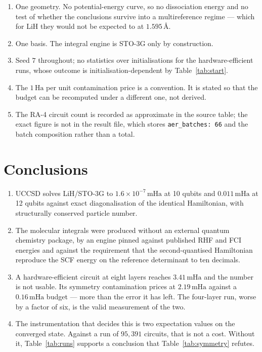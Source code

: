\documentclass[11pt,a4paper]{article}
\newcommand{\mHa}{\ensuremath{\,\mathrm{mHa}}}
\newcommand{\Ha}{\ensuremath{\,\mathrm{Ha}}}
\newcommand{\Ang}{\ensuremath{\,\text{\AA}}}
\newcommand{\code}[1]{\texttt{\small #1}}
\begin{document}
\begin{enumerate}[leftmargin=1.4em,itemsep=0.2em]
\item One geometry. No potential-energy curve, so no dissociation energy and no
  test of whether the conclusions survive into a multireference regime --- which
  for LiH they would not be expected to at $1.595\Ang$.
\item One basis. The integral engine is STO-3G only by construction.
\item Seed $7$ throughout; no statistics over initialisations for the
  hardware-efficient runs, whose outcome is initialisation-dependent by
  Table~\ref{tab:start}.
\item The $1\Ha$ per unit contamination price is a convention. It is stated so
  that the budget can be recomputed under a different one, not derived.
\item The RA-4 circuit count is recorded as approximate in the source table;
  the exact figure is not in the result file, which stores
  \code{aer\_batches: 66} and the batch composition rather than a total.
\end{enumerate}

\section{Conclusions}

\begin{enumerate}[leftmargin=1.4em,itemsep=0.25em]

\item UCCSD solves LiH/STO-3G to $1.6\times10^{-7}\mHa$ at 10 qubits and
  $0.011\mHa$ at 12 qubits against exact diagonalisation of the identical
  Hamiltonian, with structurally conserved particle number.

\item The molecular integrals were produced without an external quantum
  chemistry package, by an engine pinned against published RHF and FCI energies
  and against the requirement that the second-quantised Hamiltonian reproduce
  the SCF energy on the reference determinant to ten decimals.

\item A hardware-efficient circuit at eight layers reaches $3.41\mHa$ and the
  number is not usable. Its symmetry contamination prices at $2.19\mHa$ against
  a $0.16\mHa$ budget --- more than the error it has left. The four-layer run,
  worse by a factor of six, is the valid measurement of the two.

\item The instrumentation that decides this is two expectation values on the
  converged state. Against a run of $95{,}391$ circuits, that is not a cost.
  Without it, Table~\ref{tab:runs} supports a conclusion that
  Table~\ref{tab:symmetry} refutes.

\end{enumerate}
\end{document}
